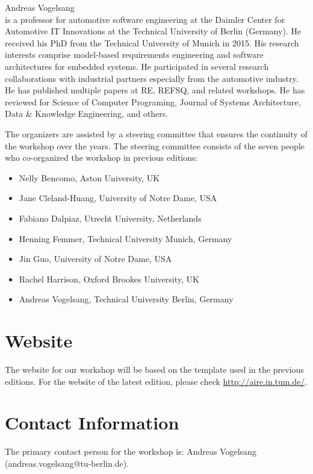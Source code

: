 \documentclass[conference,9pt]{IEEEtran}
\begin{document}
\begin{LaTeXdescription}
\item[Andreas Vogelsang]\hfill \\ is a professor for automotive software engineering at the Daimler Center for Automotive IT Innovations at the Technical University of Berlin (Germany). He received his PhD from the Technical University of Munich in 2015. His research interests comprise model-based requirements engineering and software architectures for embedded systems. He participated in several research collaborations with industrial partners especially from the automotive industry. He has published multiple papers at RE, REFSQ, and related workshops. He has reviewed for Science of Computer Programing, Journal of Systems Architecture, Data \& Knowledge Engineering, and others.
\end{LaTeXdescription}

The organizers are assisted by a steering committee that ensures the continuity of the workshop over the years. The steering committee consists of the seven people who co-organized the workshop in previous editions:
\begin{itemize}
\item Nelly Bencomo, Aston University, UK
\item Jane Cleland-Huang, University of Notre Dame, USA
\item Fabiano Dalpiaz, Utrecht University, Netherlands
\item Henning Femmer, Technical University Munich, Germany
\item Jin Guo, University of Notre Dame, USA
\item Rachel Harrison, Oxford Brookes University, UK
\item Andreas Vogelsang, Technical University Berlin, Germany
\end{itemize}

\section{Website}
The website for our workshop will be based on the template used in the previous editions. For the website of the latest edition, please check \url{http://aire.in.tum.de/}. 

\section{Contact Information}
The primary contact person for the workshop is: Andreas Vogelsang (andreas.vogelsang@tu-berlin.de).




\end{document}
